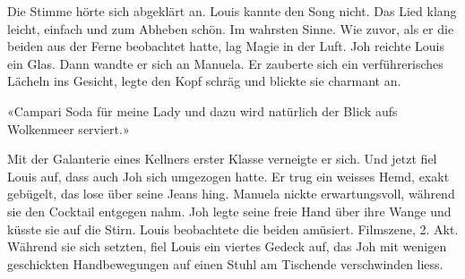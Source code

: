 
Die Stimme hörte sich abgeklärt an. Louis kannte den Song nicht. Das
Lied klang leicht, einfach und zum Abheben schön. Im wahrsten Sinne. Wie
zuvor, als er die beiden aus der Ferne beobachtet hatte, lag Magie in 
der Luft. 
Joh reichte Louis ein Glas. Dann wandte er sich an Manuela.
Er zauberte sich ein verführerisches Lächeln ins Gesicht, legte den Kopf schräg und blickte sie charmant an.

«Campari Soda für meine Lady und dazu wird natürlich der Blick aufs Wolkenmeer serviert.»

Mit der Galanterie eines Kellners erster Klasse verneigte er sich. Und
jetzt fiel Louis auf, dass auch Joh sich umgezogen hatte. Er trug ein
weisses Hemd, exakt gebügelt, das lose über seine Jeans hing. Manuela
nickte erwartungsvoll, während sie den Cocktail entgegen nahm. Joh legte
seine freie Hand über ihre Wange und küsste sie auf die Stirn.
Louis beobachtete die beiden amüsiert. Filmszene, 2. Akt.
Während sie sich setzten, fiel Louis ein viertes Gedeck auf, das Joh mit
wenigen geschickten Handbewegungen auf einen Stuhl am Tischende verschwinden
liess.
